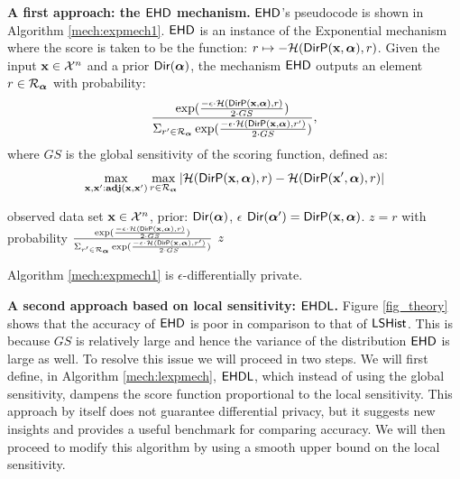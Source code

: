 \documentclass{article}
\begin{document}
\noindent \textbf{A first approach: the $\expmech$ mechanism.}
\label{sec_ehd}
$\expmech$'s pseudocode is shown in Algorithm \ref{mech:expmech1}. $\expmech$ is an instance
of the Exponential mechanism where the score is taken to be the function: $r\mapsto -\mathcal{H}(\mathsf{DirP}(\textbf{x}, \boldsymbol{\alpha}), r)$.
Given the input $\textbf{x}\in\mathcal{X}^n$ and a prior $\mathsf{Dir}(\boldsymbol{\alpha})$, the mechanism $\expmech$ outputs an element $r\in\mathcal{R}_{\boldsymbol{\alpha}}$ with  probability: 
\[
\frac
  {\exp(\frac{-\epsilon\cdot \mathcal{H}(\mathsf{DirP}(\textbf{x},\boldsymbol{\alpha}), r)}{2\cdot GS})}
{\Sigma_{r' \in \mathcal{R}_{\boldsymbol{\alpha}}}\exp(\frac{-\epsilon\cdot \mathcal{H}(\mathsf{DirP}(\textbf{x},\boldsymbol{\alpha}), r')}{2\cdot GS})},
\]
where $GS$ is the global sensitivity of the scoring function, defined as:
\[
\max_{\textbf{x},\textbf{x}': \\ \textbf{adj}(\textbf{x},\textbf{x}')}\max_{r\in \mathcal{R}_{\boldsymbol{\alpha}}}
|\mathcal{H}(\mathsf{DirP}(\textbf{x},\boldsymbol{\alpha}), r) - \mathcal{H}(\mathsf{DirP}(\textbf{x}',\boldsymbol{\alpha}), r)|
\]
% 
  \begin{algorithm}
  \caption{$\expmech$}
  \label{mech:expmech1}
  \begin{algorithmic}
  \INPUT observed data set $\textbf{x} \in \mathcal{X}^n$, prior: $\mathsf{Dir}(\boldsymbol{\alpha})$, $\epsilon$
  \STATE {} $\mathsf{Dir}(\boldsymbol{\alpha}')= \mathsf{DirP}(\textbf{x},\boldsymbol{\alpha})$.   
  \STATE {} $z=r$ with probability $\frac
  {\exp(\frac{-\epsilon\cdot \mathcal{H}(\mathsf{DirP}(\textbf{x},\boldsymbol{\alpha}), r)}{2\cdot GS})}
{\Sigma_{r' \in \mathcal{R}_{\boldsymbol{\alpha}}}\exp(\frac{-\epsilon\cdot \mathcal{H}(\mathsf{DirP}(\textbf{x},\boldsymbol{\alpha}), r')}{2\cdot GS})}$
 $z$
  \end{algorithmic}
  \end{algorithm}
\begin{lem}
  Algorithm \ref{mech:expmech1} is $\epsilon$-differentially private.
\end{lem}


\noindent \textbf{A second approach based on local sensitivity: $\mathsf{EHDL}$.}
\label{sec_ehdl}
Figure \ref{fig_theory} shows that  the accuracy of
$\expmech$ is poor in comparison to that of $\mathsf{LSHist}$. This is because
$GS$ is relatively large and hence the variance of the distribution $\expmech$ is large as well. To resolve this issue we
will proceed in two steps. We will first define, in Algorithm   \ref{mech:lexpmech}, $\mathsf{EHDL}$, which instead of using the global sensitivity, dampens the score function proportional to the local sensitivity. This approach by itself does not guarantee differential privacy, but it suggests new insights and provides a useful benchmark for comparing accuracy.
We will then proceed to modify this algorithm by using a smooth upper bound on the local sensitivity.
\end{document}
